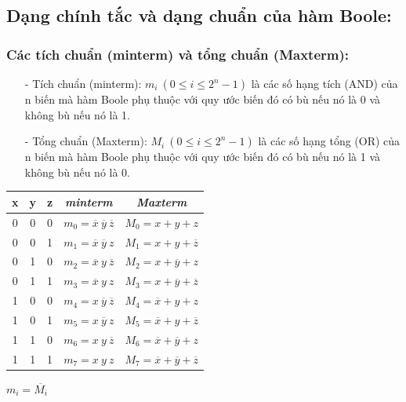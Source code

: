 \subsection{Dạng chính tắc và dạng chuẩn của hàm Boole:}
\subsubsection{Các tích chuẩn (minterm) và tổng chuẩn (Maxterm):}
\begin{itemize}
    \item[-] Tích chuẩn (minterm): $m_i \ (0 \leq i \leq 2^n - 1)$ là các số hạng tích (AND) của n biến mà hàm Boole phụ thuộc với quy ước biến đó có bù nếu nó là 0 và không bù nếu nó là 1.
    \item[-] Tổng chuẩn (Maxterm): $M_i \ (0 \leq i \leq 2^n - 1)$ là các số hạng tổng (OR) của n biến mà hàm Boole phụ thuộc với quy ước biến đó có bù nếu nó là 1 và không bù nếu nó là 0.
\end{itemize}
\begin{table}[h!]
    \centering
    \begin{tabular}{|ccc|c|c|}
    \hline
    \textbf{x} & \textbf{y} & \textbf{z} & \textit{\textbf{minterm}} & \textit{\textbf{Maxterm}} \\ \hline
    0 & 0 & 0 & $m_0 = \overline{x}\ \overline{y}\ \overline{z}$ & $M_0 = x+y+z$ \\ 
    0 & 0 & 1 & $m_1 = \overline{x}\ \overline{y}\ z$            & $M_1 = x+y+\overline{z}$ \\ 
    0 & 1 & 0 & $m_2 = \overline{x}\ y\ \overline{z}$            & $M_2 = x+\overline{y}+z$ \\ 
    0 & 1 & 1 & $m_3 = \overline{x}\ y\ z$                       & $M_3 = x+\overline{y}+\overline{z}$ \\ 
    1 & 0 & 0 & $m_4 = x\ \overline{y}\ \overline{z}$            & $M_4 = \overline{x}+y+z$ \\ 
    1 & 0 & 1 & $m_5 = x\ \overline{y}\ z$                       & $M_5 = \overline{x}+y+\overline{z}$ \\ 
    1 & 1 & 0 & $m_6 = x\ y\ \overline{z}$                       & $M_6 = \overline{x}+\overline{y}+z$ \\ 
    1 & 1 & 1 & $m_7 = x\ y\ z$                                  & $M_7 = \overline{x} + \overline{y} + \overline{z}$ \\ \hline
    \end{tabular}
    \qquad \qquad $m_i = \overline{M_i}$
\end{table}
\newpage
